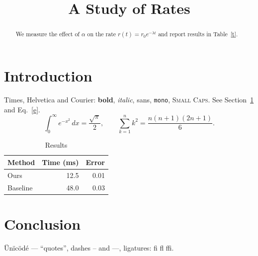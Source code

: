 \documentclass[conference]{IEEEtran}
\title{A Study of Rates}\author{\IEEEauthorblockN{A. Author}\IEEEauthorblockA{University}}
\begin{document}
\maketitle
\begin{abstract}
We measure the effect of $\alpha$ on the rate $r(t)=r_0e^{-\lambda t}$ and report results in Table~\ref{t}.
\end{abstract}
\section{Introduction}\label{s}
Times, Helvetica and Courier: \textbf{bold}, \textit{italic}, \textsf{sans}, \texttt{mono}, \textsc{Small Caps}. See Section~\ref{s} and Eq.~\eqref{e}.
\begin{equation}\label{e}
\int_0^\infty e^{-x^2}\,dx=\frac{\sqrt\pi}{2},\qquad \sum_{k=1}^{n}k^2=\frac{n(n+1)(2n+1)}{6}.
\end{equation}
\begin{table}[t]\centering\caption{Results}\label{t}
\begin{tabular}{lrr}\hline Method & Time (ms) & Error\\\hline Ours & 12.5 & 0.01\\ Baseline & 48.0 & 0.03\\\hline\end{tabular}
\end{table}
\section{Conclusion}
Ünïcödé — “quotes”, dashes -- and ---, ligatures: fi fl ffi.
\end{document}
